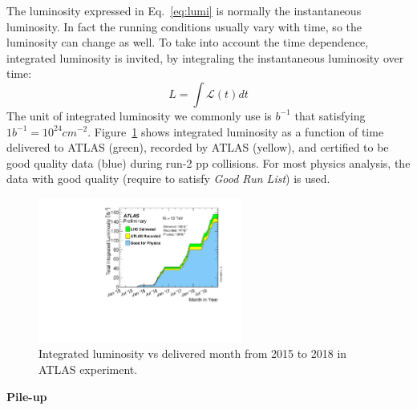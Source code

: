 The luminosity expressed in Eq.~\ref{eq:lumi} is normally the instantaneous luminosity.
In fact the running conditions usually vary with time, so the luminosity can change as well.
To take into account the time dependence, integrated luminosity is invited, by integraling the instantaneous luminosity over time:
\begin{equation}
	L = \int \mathcal{L}(t) dt
\end{equation}
The unit of integrated luminosity we commonly use is $b^{-1}$ that satisfying $1 b^{-1} = 10^{24} cm^{-2}$.
Figure~\ref{fig:lumi_vs_time} shows integrated luminosity as a function of time delivered to ATLAS (green), 
recorded by ATLAS (yellow), and certified to be good quality data (blue) during run-2 pp collisions.
For most physics analysis, the data with good quality (require to satisfy \textit{Good Run List}) is used.
\begin{figure}[!htb]
  \centering
  \includegraphics[width=0.6\textwidth]{figures/Detector/intlumivstimeRun2DQall.pdf}
  \caption{Integrated luminosity vs delivered month from 2015 to 2018 in ATLAS experiment.}
  \label{fig:lumi_vs_time}
\end{figure}

\textbf{Pile-up}


